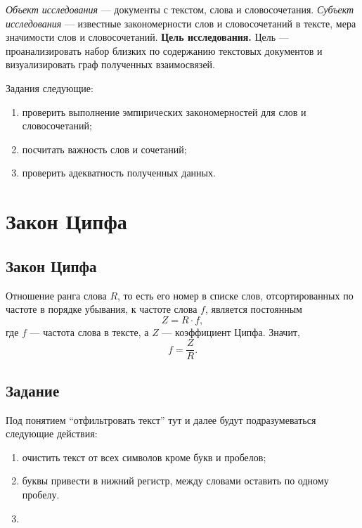 \textit{Объект исследования} --- документы с текстом, слова и словосочетания.
\textit{Субъект исследования} --- известные закономерности слов и словосочетаний
в тексте, мера значимости слов и словосочетаний.
\textbf{Цель исследования.}
Цель --- проанализировать набор близких по содержанию текстовых документов
и визуализировать граф полученных взаимосвязей.

Задания следующие:
\begin{enumerate}
  \item 
    проверить выполнение эмпирических закономерностей для слов и словосочетаний;
  \item
    посчитать важность слов и сочетаний;
  \item
    проверить адекватность полученных данных.
\end{enumerate}

\chapter{Закон Ципфа}

\section{Закон Ципфа}
Отношение ранга слова $R$, то есть его номер в списке слов,
отсортированных по частоте в порядке убывания, к частоте слова $f$,
является постоянным \cite{JeanBaptiste}
\begin{equation*}
  Z = R \cdot f,
\end{equation*}
где $f$ --- частота слова в тексте, а $Z$ --- коэффициент Ципфа.
Значит,
\begin{equation*}
  f = \frac{Z}{R}.
\end{equation*}

\section{Задание}

Под понятием ``отфильтровать текст'' тут и далее будут подразумеваться
следующие действия:
\begin{enumerate}
  \item
    очистить текст от всех символов кроме букв и пробелов;
  \item
    буквы привести в нижний регистр, между словами оставить по одному пробелу.
  \item
\end{enumerate}

